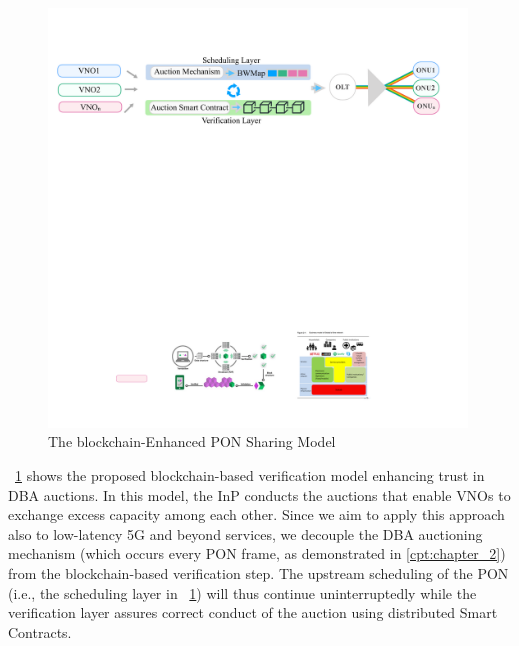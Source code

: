 \begin{figure}[htbp]
  \centering
  \includegraphics[width=0.99\textwidth]{Figures/ICBC-model.pdf}
\caption{The blockchain-Enhanced \ac{PON} Sharing Model }
\label{Fig_pon_bc_model}
\end{figure}
\figureautorefname~\ref{Fig_pon_bc_model} shows the proposed blockchain-based verification model enhancing trust in \ac{DBA} auctions. 
In this model, the \ac{InP} conducts the auctions that enable \acp{VNO} to exchange excess capacity among each other.
Since we aim to apply this approach also to low-latency \ac{5G} and beyond services, we decouple the \ac{DBA} auctioning mechanism (which occurs every \ac{PON} frame, as demonstrated in \autoref{cpt:chapter_2}) from the blockchain-based verification step. The upstream scheduling of the \ac{PON} (i.e., the scheduling layer in \figureautorefname~\ref{Fig_pon_bc_model}) will thus continue uninterruptedly while the verification layer assures correct conduct of the auction using distributed Smart Contracts. %
